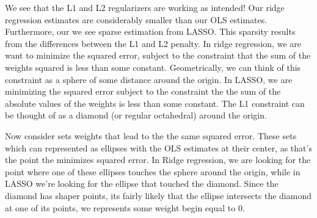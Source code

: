 \documentclass[10pt]{article}
\begin{document}
We see that the L1 and L2 regularizers are working as intended! Our ridge regression estimates are considerably smaller than our OLS estimates. Furthermore, our we see sparse estimation from LASSO. This sparsity results from the differences between the L1 and L2 penalty. In ridge regression, we are want to minimize the squared error, subject to the constraint that the sum of the weights squared is less than some constant. Geometrically, we can think of this constraint as a sphere of some distance around the origin. In LASSO, we are minimizing the squared error subject to the constraint the the sum of the absolute values of the weights is less than some constant. The L1 constraint can be thought of as a diamond (or regular octahedral) around the origin.

Now consider sets weights that lead to the the same squared error. These sets which can represented as ellipses with the OLS estimates at their center, as that's the point the minimizes squared error. In Ridge regression, we are looking for the point where one of these ellipses touches the sphere around the origin, while in LASSO we're looking for the ellipse that touched the diamond. Since the diamond has shaper points, its fairly likely that the ellipse intersects the diamond at one of its points, we represents some weight begin equal to 0.

	
\end{document}
